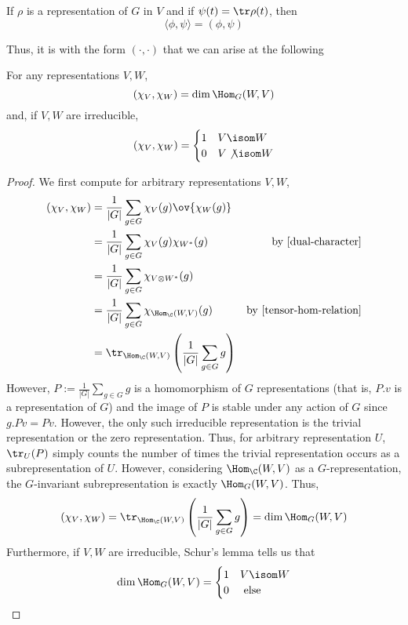 \documentclass[11pt,leqno,oneside]{amsbook}
\numberwithin{thm}{section}
\begin{document}
\begin{prop}
  If \(\rho\) is a representation of \(G\) in \(V\) and if \(\psi(t) =
  \tr \rho(t)\), then \[
    \langle \phi, \psi \rangle = (\phi, \psi)
  \]
\end{prop}
Thus, it is with the form \((\cdot, \cdot)\) that we can arise at the
following
\begin{thm}\label{orthonormal}
  For any representations \(V,W\), \[
    (\chi_V, \chi_W) = \dim \Hom_G(W,V) 
  \]
  and, if \(V,W\) are irreducible, \[
    (\chi_V, \chi_W) =
    \begin{cases}
      1 & V \isom W \\
      0 & V \not \isom W
    \end{cases}
  \]
\end{thm}
\begin{proof}
  We first compute for arbitrary representations \(V,W\),
  \begin{align*}
    (\chi_V, \chi_W) & = \frac{1}{|G|} \sum_{g \in G} \chi_V(g)
                       \ov{\chi_W(g)} \\
                     & = \frac{1}{|G|} \sum_{g \in G} \chi_V(g)
                       \chi_{W^*}(g) & \text{by \ref{dual-character}}\\
                     & = \frac{1}{|G|} \sum_{g \in G} \chi_{V \otimes
                       W^*}(g) \\
                     & = \frac{1}{|G|} \sum_{g \in G}
                       \chi_{\Hom_\C(W,V)}(g) & \text{by \ref{tensor-hom-relation}}\\
                     & = \tr_{\Hom_\C(W,V)}\left(\frac{1}{|G|}\sum_{g \in G} g\right)
  \end{align*}
  However, \(P := \frac{1}{|G|} \sum_{g \in G} g\) is a homomorphism of
  \(G\) representations (that is, \(P.v\) is a representation
  of \(G\)) and the image of \(P\) is
  stable under any action of \(G\) since \(g.Pv = Pv\). However, the only
  such irreducible representation is the trivial representation or the
  zero representation. Thus, for
  arbitrary representation 
  \(U\), \(\tr_U(P)\) simply counts
  the number of times the trivial representation occurs as a
  subrepresentation of \(U\). However, considering \(\Hom_\C(W,V)\) as
  a \(G\)-representation, the \(G\)-invariant subrepresentation is
  exactly \(\Hom_G(W,V)\). Thus, \[
   (\chi_V, \chi_W) = \tr_{\Hom_\C(W,V)}\left(\frac{1}{|G|}\sum_{g \in G} g\right) = \dim \Hom_G(W,V)
  \]
  Furthermore, if \(V,W\) are irreducible, Schur's lemma tells us
  that \[
    \dim \Hom_G(W,V) =
    \begin{cases}
      1 & V \isom W \\
      0 & \text{ else }
    \end{cases}
  \]
\end{proof}
\end{document}
